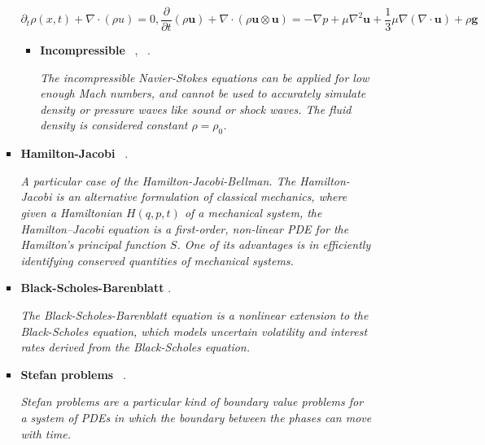 \documentclass[12pt,letterpaper]{article}
\begin{document}
\begin{itemize}
\begin{itemize}
\begin{itemize}
                $$ \partial_t \rho (x,t) + \nabla \cdot (\rho u) = 0, \frac{\partial}{\partial t}(\rho \mathbf{u})+\nabla \cdot(\rho \mathbf{u} \otimes \mathbf{u})=-\nabla p+\mu \nabla^2 \mathbf{u}+\frac{1}{3} \mu \nabla(\nabla \cdot \mathbf{u})+\rho \mathbf{g}$$
                
                \begin{itemize} 
                    \item \textbf{Incompressible} ~\cite{leongVariationalQuantumEvolution2022},  ~\cite{lapworthHybridQuantumClassicalCFD2022}.

                    \textit{The incompressible Navier-Stokes equations can be applied for low enough Mach numbers, and cannot be used to accurately simulate density or pressure waves like sound or shock waves. The fluid density is considered constant $\rho = \rho_0$.}
                \end{itemize}
    
                \item \textbf{Hamilton-Jacobi}  ~\cite{jinTimeComplexityAnalysis2022,jinQuantumAlgorithmsComputing2022}.
                
                \textit{A particular case of the Hamilton-Jacobi-Bellman. The Hamilton-Jacobi is an alternative formulation of classical mechanics, where given a Hamiltonian $H( q , p , t )$ of a mechanical system, the Hamilton–Jacobi equation is a first-order, non-linear PDE for the Hamilton's principal function $S$. One of its advantages is in efficiently identifying conserved quantities of mechanical systems.}


                \item \textbf{Black-Scholes-Barenblatt}  \cite{patelQuantumInspiredTensorNeural2022}.
                
                \textit{The Black-Scholes-Barenblatt equation is a nonlinear extension to the Black-Scholes equation, which models uncertain volatility and interest rates derived from the Black-Scholes equation.}

                \item \textbf{Stefan problems}  ~\cite{sarsengeldinHybridClassicalQuantumFramework2022}.
                
                \textit{Stefan problems are a particular kind of boundary value problems for a system of PDEs in which the boundary between the phases can move with time.}
                

\end{itemize}
\end{itemize}
\end{itemize}
\end{document}
